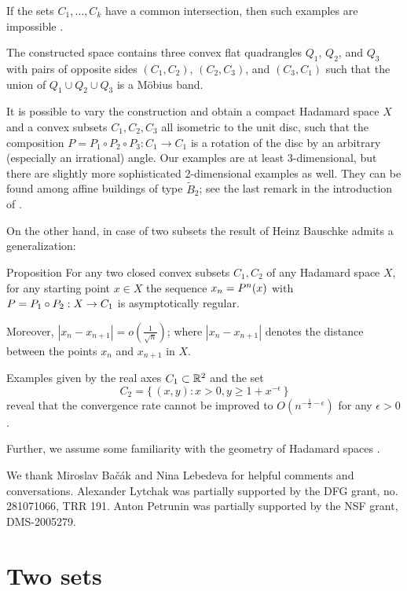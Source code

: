 \documentclass[a4paper,10pt]{article}
\begin{document}
If the sets $C_1,\dots,C_k$ have a common intersection, then such examples are impossible \cite{asymptotic,Bac2,Bac}.

The constructed space contains three convex flat quadrangles $Q_1$, $Q_2$, and $Q_3$ with pairs of opposite sides $(C_1,C_2)$, $(C_2,C_3)$, and $(C_3,C_1)$ such that the union of $Q_1\cup Q_2\cup Q_3$ is a Möbius band.

It is possible to vary the construction and obtain a compact Hadamard space $X$ and a  convex subsets $C_1,C_2,C_3$ all isometric to the unit disc, such that the composition $P=P_1\circ P_2\circ P_3 :C_1\to C_1$  is a rotation of the disc by an arbitrary (especially an irrational) angle.
Our examples are at least 3-dimensional, but there are slightly more sophisticated 2-dimensional examples as well.
They can be found among affine buildings of type $\tilde B_2$; see the last remark in the introduction of \cite{balser}. 

On the other hand, in case of two subsets the result of  Heinz Bauschke \cite{Bauschke} admits a generalization:

\begin{thm}{Proposition} \label{prop}
For any two closed convex subsets $C_1,C_2$ of any Hadamard space $X$, for any starting point $x\in X$  the sequence $x_n \z= P^n (x)$ with $P\z=  P_1\circ P_2 :X\to C_1$ is asymptotically  regular.

Moreover, 
$|x_n-x_{n+1}| =o (\frac  {1} {\sqrt n})$;
where $|x_n-x_{n+1}|$ denotes the distance between the points $x_n$ and $x_{n+1}$ in $X$.
\end{thm}

Examples given by the real axes $C_1 \subset \mathbb{R}^2$ and the set
\[C_2  = \{\,(x,y):x>0, y \geq 1+ x^{ -\epsilon}\,\}\]
reveal that the convergence rate cannot be improved to $O (n^{-\frac 1 2  -\epsilon})$ for any $\epsilon >0$.

Further, we assume some familiarity with the geometry of Hadamard spaces \cite{BBI,BH,AKP,AKP_inv,ballmannbook}.

We thank Miroslav Bačák and Nina Lebedeva for helpful comments and conversations.
Alexander Lytchak was partially supported by the DFG grant, no. 281071066, TRR 191.
Anton Petrunin was partially supported by the NSF grant, DMS-2005279.


\section{Two sets}
\end{document}
